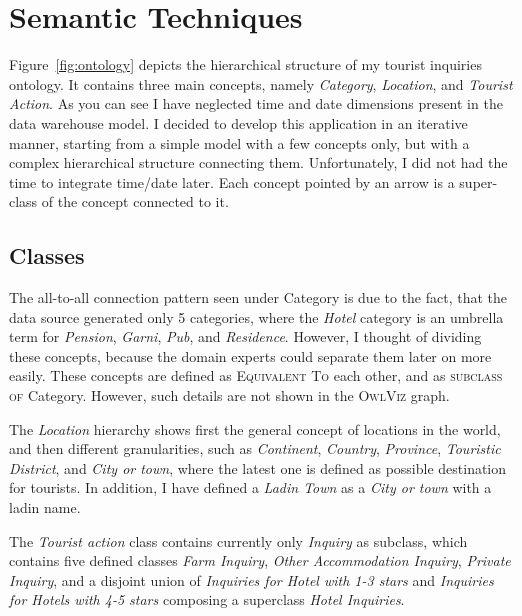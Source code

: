 
\section{Semantic Techniques}
\label{chapter:semantictechniques}

Figure~\ref{fig:ontology} depicts the hierarchical structure of my tourist inquiries ontology. It contains three main concepts, namely \textit{Category}, \textit{Location}, and \textit{Tourist Action}. As you can see I have neglected time and date dimensions present in the data warehouse model. I decided to develop this application in an iterative manner, starting from a simple model with a few concepts only, but with a complex hierarchical structure connecting them. Unfortunately, I did not had the time to integrate time/date later. Each concept pointed by an arrow is a super-class of the concept connected to it. 

\subsection{Classes}

The all-to-all connection pattern seen under Category is due to the fact, that the data source generated only 5 categories, where the \textit{Hotel} category is an umbrella term for \textit{Pension}, \textit{Garni}, \textit{Pub}, and \textit{Residence}. However, I thought of dividing these concepts, because the domain experts could separate them later on more easily. These concepts are defined as \textsc{Equivalent To} each other, and as \textsc{subclass of} Category. However, such details are not shown in the \textsc{OwlViz} graph.

The \textit{Location} hierarchy shows first the general concept of locations in the world, and then different granularities, such as \textit{Continent}, \textit{Country}, \textit{Province}, \textit{Touristic District}, and \textit{City or town}, where the latest one is defined as possible destination for tourists. In addition, I have defined a \textit{Ladin Town} as a \textit{City or town} with a ladin name.

The \textit{Tourist action} class contains currently only \textit{Inquiry} as subclass, which contains five defined classes \textit{Farm Inquiry}, \textit{Other Accommodation Inquiry}, \textit{Private Inquiry}, and a disjoint union of \textit{Inquiries for Hotel with 1-3 stars} and \textit{Inquiries for Hotels with 4-5 stars} composing a superclass \textit{Hotel Inquiries}.

